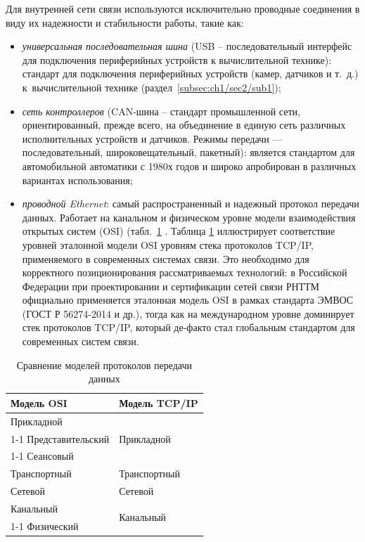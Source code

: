 Для внутренней сети связи используются исключительно проводные соединения в виду их надежности и стабильности работы, такие как:
\begin{itemize}[beginpenalty=10000, midpenalty=10000, wide=\parindent, leftmargin=0pt]
	\item \textit{универсальная последовательная шина} (USB -- последовательный интерфейс для подключения периферийных устройств к вычислительной технике):
	стандарт для подключения периферийных устройств (камер, датчиков и т.\ д.) к~вычислительной технике (раздел\ \ref{subsec:ch1/sec2/sub1});

	\item \textit{сеть контроллеров} (CAN-шина -- стандарт промышленной сети, ориентированный, прежде всего, на объединение в единую сеть различных исполнительных устройств и датчиков. Режимы передачи — последовательный, широковещательный, пакетный):
	является стандартом для автомобильной автоматики с 1980х годов и широко апробирован в различных вариантах использования;

	\item \textit{проводной Ethernet}:
	самый распространенный и надежный протокол передачи данных. Работает на канальном и физическом уровне модели взаимодействия открытых систем (OSI) (табл.\ \cref{tab:OSIvsTCPIP} \cite{Olifers, TCP_IP, ComputerNetwork}. Таблица \cref{tab:OSIvsTCPIP} иллюстрирует соответствие уровней эталонной модели OSI уровням стека протоколов TCP/IP, применяемого в современных системах связи. Это необходимо для корректного позиционирования рассматриваемых технологий: в Российской Федерации при проектировании и сертификации сетей связи РНТТМ официально применяется эталонная модель OSI в рамках стандарта ЭМВОС (ГОСТ Р 56274-2014 и др.), тогда как на международном уровне доминирует стек протоколов TCP/IP, который де-факто стал глобальным стандартом для современных систем связи.
\end{itemize}


\begin{table}[htbp]
	\centering
	\caption{Сравнение моделей протоколов передачи данных}\label{tab:OSIvsTCPIP}
	\begin{tabular}{|l|l|}
		\hline
		\textbf{Модель OSI} & \textbf{Модель TCP/IP} \\ \hline
		Прикладной & \multirow{3}{*}{Прикладной} \\ \cline{1-1}
		Представительский & \\ \cline{1-1}
		Сеансовый & \\ \hline
		Транспортный & Транспортный \\ \hline
		Сетевой & Сетевой \\ \hline
		Канальный & \multirow{2}{*}{Канальный} \\ \cline{1-1}
		Физический & \\ \hline
	\end{tabular}%
\end{table}

